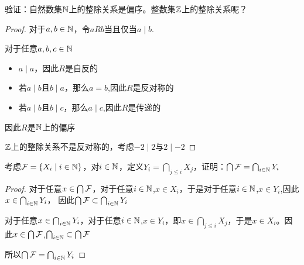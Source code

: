 \documentclass[11pt]{article}
\begin{document}
\begin{exercise}
验证：自然数集\(\mathbb{N}\)上的整除关系是偏序。整数集\(\mathbb{Z}\)上的整除关系呢？
\end{exercise}

\begin{proof}
对于\(a,b\in\mathbb{N}\)，令\(aRb\)当且仅当\(a\mid b\).

对于任意\(a,b,c\in\mathbb{N}\)
\begin{itemize}
\item \(a\mid a\)，因此\(R\)是自反的
\item 若\(a\mid b\)且\(b\mid a\)，那么\(a=b\),因此\(R\)是反对称的
\item 若\(a\mid b\)且\(b\mid c\)，那么\(a\mid c\),因此\(R\)是传递的
\end{itemize}


因此\(R\)是\(\mathbb{N}\)上的偏序

\(\mathbb{Z}\)上的整除关系不是反对称的，考虑\(-2\mid 2\)与\(2\mid -2\)
\end{proof}

\begin{exercise}
考虑\(\mathcal{F}=\{X_i\mid i\in\mathbb{N}\}\)，对\(i\in\mathbb{N}\)，定义\(Y_i=\bigcap_{j\le i}X_j\)，证明：\(\bigcap\mathcal{F}=\bigcap_{i\in\mathbb{N}}Y_i\)
\end{exercise}

\begin{proof}
对于任意\(x\in\bigcap\mathcal{F}\)，对于任意\(i\in\mathbb{N}\),\(x\in X_i\)，于是对于任意\(i\in\mathbb{N}\),\(x\in Y_i\),因此\(x\in\bigcap_{i\in\mathbb{N}}Y_i\)，
因此\(\bigcap\mathcal{F}\subset\bigcap_{i\in\mathbb{N}}Y_i\)

对于任意\(x\in\bigcap_{i\in\mathbb{N}}Y_i\)，对于任意\(i\in\mathbb{N}\),\(x\in Y_i\)，即\(x\in\bigcap_{j\le i}X_j\)，于是\(x\in X_i\)。因
此\(x\in\bigcap\mathcal{F}\),\(\bigcap_{i\in\mathbb{N}}\subset\bigcap\mathcal{F}\)

所以\(\bigcap\mathcal{F}=\bigcap_{i\in\mathbb{N}}Y_i\)
\end{proof}
\end{document}
